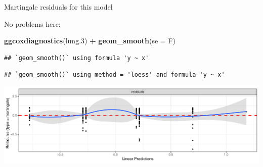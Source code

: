 \documentclass[
  ignorenonframetext,
]{beamer}
\newenvironment{Shaded}{\begin{snugshade}}{\end{snugshade}}
\newcommand{\DataTypeTok}[1]{\textcolor[rgb]{0.13,0.29,0.53}{#1}}
\newcommand{\FloatTok}[1]{\textcolor[rgb]{0.00,0.00,0.81}{#1}}
\newcommand{\KeywordTok}[1]{\textcolor[rgb]{0.13,0.29,0.53}{\textbf{#1}}}
\newcommand{\NormalTok}[1]{#1}
\newcommand{\OperatorTok}[1]{\textcolor[rgb]{0.81,0.36,0.00}{\textbf{#1}}}
\newcommand{\StringTok}[1]{\textcolor[rgb]{0.31,0.60,0.02}{#1}}
\begin{document}
\begin{frame}[fragile]{Martingale residuals for this model}
\protect\hypertarget{martingale-residuals-for-this-model}{}

No problems here:

\begin{Shaded}
\begin{Highlighting}[]
\KeywordTok{ggcoxdiagnostics}\NormalTok{(lung}\FloatTok{.3}\NormalTok{) }\OperatorTok{+}\StringTok{ }\KeywordTok{geom_smooth}\NormalTok{(}\DataTypeTok{se =}\NormalTok{ F)}
\end{Highlighting}
\end{Shaded}

\begin{verbatim}
## `geom_smooth()` using formula 'y ~ x'
\end{verbatim}

\begin{verbatim}
## `geom_smooth()` using method = 'loess' and formula 'y ~ x'
\end{verbatim}

\includegraphics{slides_d29_files/figure-beamer/unnamed-chunk-181-1.pdf}

\end{frame}
\end{document}
